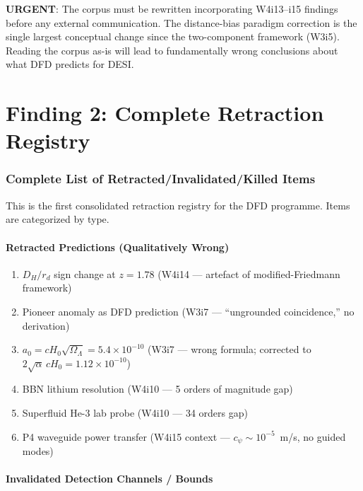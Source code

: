 \documentclass[11pt]{article}
\newcommand{\ee}[1]{\times 10^{#1}}
\begin{document}
\begin{tcolorbox}[colback=red!10, colframe=red!70!black]
\textbf{URGENT}: The corpus must be rewritten incorporating W4i13--i15
findings before any external communication.  The distance-bias paradigm
correction is the single largest conceptual change since the two-component
framework (W3i5).  Reading the corpus as-is will lead to fundamentally
wrong conclusions about what DFD predicts for DESI.
\end{tcolorbox}


\part{Finding 2: Complete Retraction Registry}
\label{sec:retraction}

\section{Complete List of Retracted/Invalidated/Killed Items}

This is the first consolidated retraction registry for the DFD programme.
Items are categorized by type.

\subsection{Retracted Predictions (Qualitatively Wrong)}

\begin{enumerate}[nosep]
\item $D_H/r_d$ sign change at $z = 1.78$ (W4i14 --- artefact of
  modified-Friedmann framework)
\item Pioneer anomaly as DFD prediction (W3i7 --- ``ungrounded
  coincidence,'' no derivation)
\item $a_0 = cH_0\sqrt{\Omega_\Lambda} = 5.4\ee{-10}$ (W3i7 --- wrong
  formula; corrected to $2\sqrt{\alpha}\,cH_0 = 1.12\ee{-10}$)
\item BBN lithium resolution (W4i10 --- 5 orders of magnitude gap)
\item Superfluid He-3 lab probe (W4i10 --- 34 orders gap)
\item P4 waveguide power transfer (W4i15 context --- $c_\psi \sim
  10^{-5}$~m/s, no guided modes)
\end{enumerate}

\subsection{Invalidated Detection Channels / Bounds}
\end{document}
